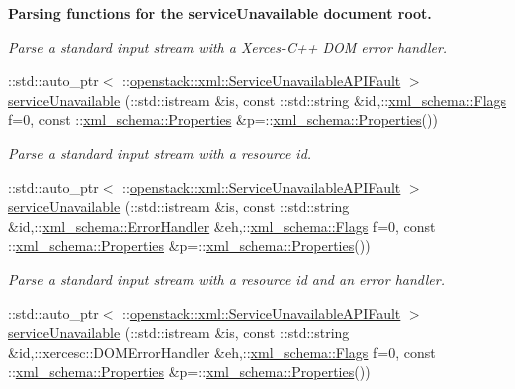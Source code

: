 \begin{Indent}{\bf Parsing functions for the serviceUnavailable document root.}
\begin{DoxyCompactItemize}
\begin{DoxyCompactList}\small\item\em Parse a standard input stream with a Xerces-\/C++ DOM error handler. \item\end{DoxyCompactList}\item 
::std::auto\_\-ptr$<$ ::\hyperlink{classopenstack_1_1xml_1_1ServiceUnavailableAPIFault}{openstack::xml::ServiceUnavailableAPIFault} $>$ \hyperlink{namespaceopenstack_1_1xml_a1592c6d818e8369d2ed90abb2d837ae7}{serviceUnavailable} (::std::istream \&is, const ::std::string \&id,::\hyperlink{namespacexml__schema_affb4c227cbd9aa7453dd1dc5a1401943}{xml\_\-schema::Flags} f=0, const ::\hyperlink{namespacexml__schema_ad27ce19a7ee1d3b1064092648898f64c}{xml\_\-schema::Properties} \&p=::\hyperlink{namespacexml__schema_ad27ce19a7ee1d3b1064092648898f64c}{xml\_\-schema::Properties}())
\begin{DoxyCompactList}\small\item\em Parse a standard input stream with a resource id. \item\end{DoxyCompactList}\item 
::std::auto\_\-ptr$<$ ::\hyperlink{classopenstack_1_1xml_1_1ServiceUnavailableAPIFault}{openstack::xml::ServiceUnavailableAPIFault} $>$ \hyperlink{namespaceopenstack_1_1xml_ade3efc9a4c5fcf5e924c33f044e5f04d}{serviceUnavailable} (::std::istream \&is, const ::std::string \&id,::\hyperlink{namespacexml__schema_ab1c9361bfd3b404eaabf0c31eded79dc}{xml\_\-schema::ErrorHandler} \&eh,::\hyperlink{namespacexml__schema_affb4c227cbd9aa7453dd1dc5a1401943}{xml\_\-schema::Flags} f=0, const ::\hyperlink{namespacexml__schema_ad27ce19a7ee1d3b1064092648898f64c}{xml\_\-schema::Properties} \&p=::\hyperlink{namespacexml__schema_ad27ce19a7ee1d3b1064092648898f64c}{xml\_\-schema::Properties}())
\begin{DoxyCompactList}\small\item\em Parse a standard input stream with a resource id and an error handler. \item\end{DoxyCompactList}\item 
::std::auto\_\-ptr$<$ ::\hyperlink{classopenstack_1_1xml_1_1ServiceUnavailableAPIFault}{openstack::xml::ServiceUnavailableAPIFault} $>$ \hyperlink{namespaceopenstack_1_1xml_a24441b95b1cd6a4ad24db9647737c161}{serviceUnavailable} (::std::istream \&is, const ::std::string \&id,::xercesc::DOMErrorHandler \&eh,::\hyperlink{namespacexml__schema_affb4c227cbd9aa7453dd1dc5a1401943}{xml\_\-schema::Flags} f=0, const ::\hyperlink{namespacexml__schema_ad27ce19a7ee1d3b1064092648898f64c}{xml\_\-schema::Properties} \&p=::\hyperlink{namespacexml__schema_ad27ce19a7ee1d3b1064092648898f64c}{xml\_\-schema::Properties}())

\end{DoxyCompactItemize}
\end{Indent}
